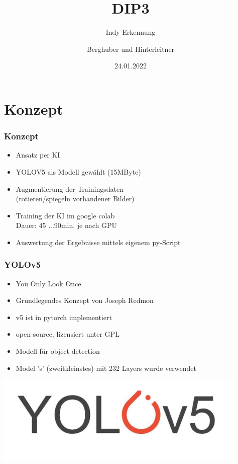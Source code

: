 \documentclass[ignorenonframetext,naustrian,12pt,t]{beamer}
\author{Berghuber und Hinterleitner}
\title{DIP3}
\subtitle{Indy Erkennung}
\date{24.01.2022}
\begin{document}
\begin{frame}
  \titlepage
\end{frame}


\section{Konzept}
	\begin{frame}
		\frametitle{Konzept}
		\begin{itemize}[label={\color{myTitleColour}\textbullet}]
		\item Ansatz per KI
		\item YOLOV5 als Modell gewählt (15MByte) 
		\item Augmentierung der Trainingsdaten \\ (rotieren/spiegeln vorhandener Bilder)
		\item Training der KI im google colab \\ Dauer: 45 ...90min, je nach GPU
		\item Auswertung der Ergebnisse mittels eigenem py-Script
		\end{itemize}
	\end{frame}
	
	\begin{frame}
		\frametitle{YOLOv5}
		\begin{itemize}[label={\color{myTitleColour}\textbullet}]
		\item You Only Look Once
		\item Grundlegendes Konzept von Joseph Redmon
		\item v5 ist in pytorch implementiert
		\item open-source, lizensiert unter GPL
		\item Modell für object detection
		\item Model 's' (zweitkleinstes) mit 232 Layers wurde verwendet
		\end{itemize}
		\centering
		\includegraphics[height=.2\textheight]{yoloLogo.png}

	\end{frame}
	
\end{document}
